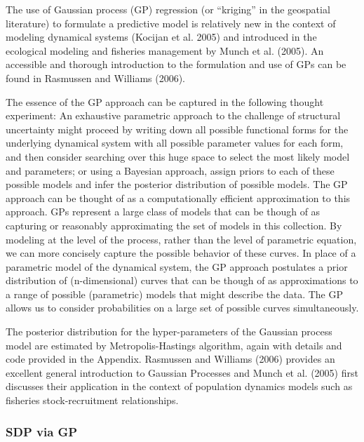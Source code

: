 \documentclass[author-year, review]{elsarticle} %
\begin{document}
The use of Gaussian process (GP) regression (or ``kriging'' in the
geospatial literature) to formulate a predictive model is relatively new
in the context of modeling dynamical systems (Kocijan et al. 2005) and
introduced in the ecological modeling and fisheries management by Munch
et al. (2005). An accessible and thorough introduction to the
formulation and use of GPs can be found in Rasmussen and Williams
(2006).

The essence of the GP approach can be captured in the following thought
experiment: An exhaustive parametric approach to the challenge of
structural uncertainty might proceed by writing down all possible
functional forms for the underlying dynamical system with all possible
parameter values for each form, and then consider searching over this
huge space to select the most likely model and parameters; or using a
Bayesian approach, assign priors to each of these possible models and
infer the posterior distribution of possible models. The GP approach can
be thought of as a computationally efficient approximation to this
approach. GPs represent a large class of models that can be though of as
capturing or reasonably approximating the set of models in this
collection. By modeling at the level of the process, rather than the
level of parametric equation, we can more concisely capture the possible
behavior of these curves. In place of a parametric model of the
dynamical system, the GP approach postulates a prior distribution of
(n-dimensional) curves that can be though of as approximations to a
range of possible (parametric) models that might describe the data. The
GP allows us to consider probabilities on a large set of possible curves
simultaneously.

The posterior distribution for the hyper-parameters of the Gaussian
process model are estimated by Metropolis-Hastings algorithm, again with
details and code provided in the Appendix. Rasmussen and Williams (2006)
provides an excellent general introduction to Gaussian Processes and
Munch et al. (2005) first discusses their application in the context of
population dynamics models such as fisheries stock-recruitment
relationships.

\subsubsection{SDP via GP}
\end{document}
